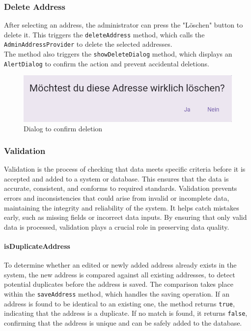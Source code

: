 \subsubsection{Delete Address}
After selecting an address, the administrator can press the "Löschen" button to delete it. This triggers the \texttt{deleteAddress} method, which calls the \texttt{AdminAddressProvider} to delete the selected addresses.\\

The method also triggers the \texttt{showDeleteDialog} method, which displays an \texttt{AlertDialog} to confirm the action and prevent accidental deletions.

\begin{figure}[H]
    \centering
    \includegraphics[width=0.6\linewidth]{images/AdminPanel/DeleteDialog.png}
    \caption{Dialog to confirm deletion}
\end{figure}

\subsubsection{Validation}
\label{fig:Validation}
    Validation is the process of checking that data meets specific criteria before it is accepted and added to a system or database. This ensures that the data is accurate, consistent, and conforms to required standards. Validation prevents errors and inconsistencies that could arise from invalid or incomplete data, maintaining the integrity and reliability of the system. It helps catch mistakes early, such as missing fields or incorrect data inputs. By ensuring that only valid data is processed, validation plays a crucial role in preserving data quality. \autocite{ContributorstoWikimediaprojects2025Feb}

\paragraph{isDuplicateAddress}
    To determine whether an edited or newly added address already exists in the system, the new address is compared against all existing addresses, to detect potential duplicates before the address is saved. The comparison takes place within the \texttt{saveAddress} method, which handles the saving operation. If an address is found to be identical to an existing one, the method returns \texttt{true}, indicating that the address is a duplicate. If no match is found, it returns \texttt{false}, confirming that the address is unique and can be safely added to the database.\\

